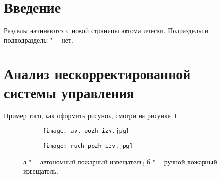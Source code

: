\section*{Введение}
\label{sec:intro}
Разделы начинаются с новой страницы автоматически. Подразделы и подподразделы "--- нет.


\section{Анализ нескорректированной системы управления}
\label{sec:analysys_equations}
Пример того, как оформить рисунок, смотри на рисунке~\ref{fig:fire_alarms}
\begin{figure}[ht]
\centering
  \begin{subfigure}[b]{0.45\textwidth} 
    \centering
    \texttt{[image: avt\_pozh\_izv.jpg]}  
    \caption{}
  \end{subfigure}
  \begin{subfigure}[b]{0.45\textwidth} 
    \centering
    \texttt{[image: ruch\_pozh\_izv.jpg]}  
    \caption{}
  \end{subfigure}
  \caption{ а  "--- автономный пожарный извещатель;
            б  "--- ручной пожарный извещатель.}
  \label{fig:fire_alarms}
\end{figure}



